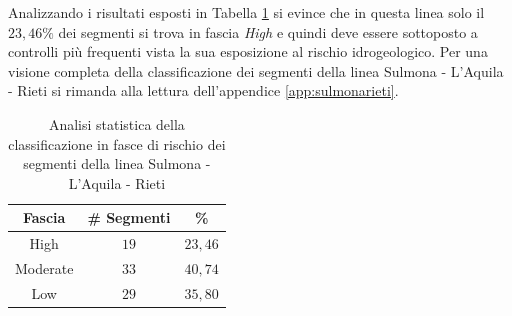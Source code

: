 \newline
Analizzando i risultati esposti in Tabella \ref{percentualesulmonarieti} si evince che in questa linea solo il $23,46\%$ dei segmenti si trova in fascia \textit{High} e quindi deve essere sottoposto a controlli più frequenti vista la sua esposizione al rischio idrogeologico. Per una visione completa della classificazione dei segmenti della linea Sulmona - L'Aquila - Rieti si rimanda alla lettura dell'appendice \ref{app:sulmonarieti}.
\begin{table}[hpt]
\centering
\begin{tabular}{|c|c|c|}
\hline \rowcolor{lightgray}
Fascia   & \# Segmenti & \%    \\ \hline \rowcolor{flamingopink}
High     & $19$           & $23,46$     \\ \hline \rowcolor{icterine}
Moderate & $33$          & $40,74$ \\ \hline \rowcolor{inchworm}
Low      & $29$          & $35,80$ \\ \hline
\end{tabular}
\caption{Analisi statistica della classificazione in fasce di rischio dei segmenti della linea Sulmona - L'Aquila - Rieti}
\label{percentualesulmonarieti}
\end{table}
\newpage
